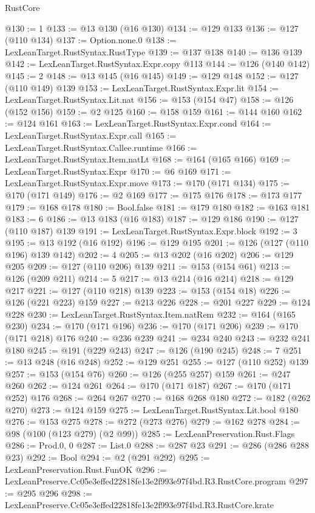 \begin{lexlean}{RustCore}
\begin{coremodule}
@130 := 1
@133 := @13 @130 (@16 @130)
@134 := @129 @133
@136 := @127 (@110 @134)
@137 := Option.none.{0}
@138 := LexLeanTarget.RustSyntax.RustType
@139 := @137 @138
@140 := @136 @139
@142 := LexLeanTarget.RustSyntax.Expr.copy @113
@144 := @126 (@140 @142)
@145 := 2
@148 := @13 @145 (@16 @145)
@149 := @129 @148
@152 := @127 (@110 @149) @139
@153 := LexLeanTarget.RustSyntax.Expr.lit
@154 := LexLeanTarget.RustSyntax.Lit.nat
@156 := @153 (@154 @47)
@158 := @126 (@152 @156)
@159 := @2 @125
@160 := @158 @159
@161 := @144 @160
@162 := @124 @161
@163 := LexLeanTarget.RustSyntax.Expr.cond
@164 := LexLeanTarget.RustSyntax.Expr.call
@165 := LexLeanTarget.RustSyntax.Callee.runtime
@166 := LexLeanTarget.RustSyntax.Item.natLt
@168 := @164 (@165 @166)
@169 := LexLeanTarget.RustSyntax.Expr
@170 := @6 @169
@171 := LexLeanTarget.RustSyntax.Expr.move
@173 := @170 (@171 @134)
@175 := @170 (@171 @149)
@176 := @2 @169
@177 := @175 @176
@178 := @173 @177
@179 := @168 @178
@180 := Bool.false
@181 := @179 @180
@182 := @163 @181
@183 := 6
@186 := @13 @183 (@16 @183)
@187 := @129 @186
@190 := @127 (@110 @187) @139
@191 := LexLeanTarget.RustSyntax.Expr.block
@192 := 3
@195 := @13 @192 (@16 @192)
@196 := @129 @195
@201 := @126 (@127 (@110 @196) @139 @142)
@202 := 4
@205 := @13 @202 (@16 @202)
@206 := @129 @205
@209 := @127 (@110 @206) @139
@211 := @153 (@154 @61)
@213 := @126 (@209 @211)
@214 := 5
@217 := @13 @214 (@16 @214)
@218 := @129 @217
@221 := @127 (@110 @218) @139
@223 := @153 (@154 @18)
@226 := @126 (@221 @223) @159
@227 := @213 @226
@228 := @201 @227
@229 := @124 @228
@230 := LexLeanTarget.RustSyntax.Item.natRem
@232 := @164 (@165 @230)
@234 := @170 (@171 @196)
@236 := @170 (@171 @206)
@239 := @170 (@171 @218) @176
@240 := @236 @239
@241 := @234 @240
@243 := @232 @241 @180
@245 := @191 (@229 @243)
@247 := @126 (@190 @245)
@248 := 7
@251 := @13 @248 (@16 @248)
@252 := @129 @251
@255 := @127 (@110 @252) @139
@257 := @153 (@154 @76)
@260 := @126 (@255 @257) @159
@261 := @247 @260
@262 := @124 @261
@264 := @170 (@171 @187)
@267 := @170 (@171 @252) @176
@268 := @264 @267
@270 := @168 @268 @180
@272 := @182 (@262 @270)
@273 := @124 @159
@275 := LexLeanTarget.RustSyntax.Lit.bool @180
@276 := @153 @275
@278 := @272 (@273 @276)
@279 := @162 @278
@284 := @98 (@100 (@123 @279) (@2 @99))
@285 := LexLeanPreservation.Rust.Flags
@286 := Prod.{0, 0}
@287 := List.{0}
@288 := @287 @23
@291 := @286 (@286 @288 @23)
@292 := Bool
@294 := @2 (@291 @292)
@295 := LexLeanPreservation.Rust.FunOK
@296 := LexLeanPreserve.Cc05e3effed22818fe13e2f993e97f4bd.R3.RustCore.program
@297 := @295 @296
@298 := LexLeanPreserve.Cc05e3effed22818fe13e2f993e97f4bd.R3.RustCore.krate

\end{coremodule}
\end{lexlean}
